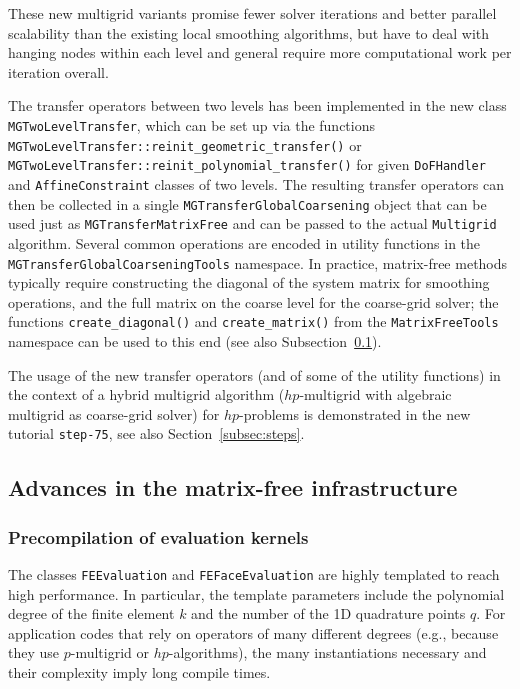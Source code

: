 \documentclass{ansarticle-preprint}
\begin{document}
These new multigrid variants promise fewer solver
iterations and better parallel scalability than the existing local
smoothing algorithms, but have to deal with
hanging nodes within each level and general require more computational
work per iteration overall.

The transfer operators between two levels has been implemented in the new class \texttt{MGTwoLevelTransfer}, which can be set up via the functions \texttt{MGTwoLevelTransfer::\allowbreak reinit\_\allowbreak geometric\_\allowbreak transfer()} or \texttt{MGTwo\allowbreak LevelTransfer::\allowbreak reinit\_\allowbreak polynomial\_\allowbreak transfer()} for given
\texttt{DoFHandler} and \texttt{AffineConstraint} classes of two levels. The resulting transfer operators
can then be collected in a single
\texttt{MGTransferGlobalCoarsening} object that can be used just as \texttt{MGTransferMatrixFree} and can be passed to the actual \texttt{Multigrid}
algorithm.
Several common operations are encoded in utility
functions in the \texttt{MGTransferGlobalCoarseningTools}
namespace. In practice, matrix-free methods typically require
constructing the diagonal of the system matrix for smoothing
operations, and the full matrix on the coarse level for the coarse-grid solver;
the functions \texttt{create\_diagonal()} and \texttt{create\_matrix()} from
the \texttt{MatrixFreeTools} namespace can be used to this end (see also Subsection~\ref{subsec:mf}).

The usage of the new transfer operators (and of some of the utility
functions) in the context of a hybrid multigrid algorithm
($hp$-multigrid with algebraic multigrid as coarse-grid solver) for $hp$-problems is demonstrated in the new tutorial \texttt{step-75}, see also Section~\ref{subsec:steps}.



\subsection{Advances in the matrix-free infrastructure}
\label{subsec:mf}

\subsubsection{Precompilation of evaluation kernels}

The classes \texttt{FEEvaluation} and \texttt{FEFaceEvaluation} are highly
templated to reach high performance. In particular, the template parameters include
the polynomial degree of the finite element $k$ and the number of the 1D quadrature points $q$.
For application codes that rely on operators of many different degrees (e.g., because
they use $p$-multigrid or $hp$-algorithms), the many instantiations
necessary and their complexity
imply long compile times.
\end{document}

